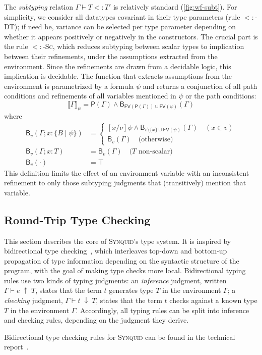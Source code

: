 \documentclass[10pt,preprint]{sigplanconf-pldi16}
\theoremstyle{definition}
\renewcommand{\And}{\wedge}
\newcommand{\Subt}{<:}
\newcommand{\env}{\Gamma}
\newcommand{\produce}{\;\uparrow\;}
\newcommand{\consume}{\;\downarrow\;}
\newcommand{\fv}{\mathsf{FV}}
\newcommand{\pathc}[1]{\mathsf{P}({#1})}
\newcommand{\bnd}[2]{\mathsf{B}_{#1}({#2})}
\newcommand{\lang}{\textsc{Synquid}\xspace}
\newif\iflong
\begin{document}
The \emph{subtyping} relation $\env \vdash T \Subt T'$ is relatively standard (\autoref{fig:wf-subt}).
For simplicity, we consider all datatypes covariant in their type parameters (rule \textsc{$\Subt$-DT});
if need be, variance can be selected per type parameter 
depending on whether it appears positively or negatively in the constructors.
The crucial part is the rule \textsc{$\Subt$-Sc}, which reduces subtyping between scalar types to implication between their refinements,
under the assumptions extracted from the environment.
Since the refinements are drawn from a decidable logic, this implication is decidable.
The function that extracts assumptions from the environment is parametrized by a formula $\psi$
and returns a conjunction of all path conditions and refinements of all variables mentioned in $\psi$ or the path conditions:
$$
\llbracket\Gamma\rrbracket_{\psi} = \pathc{\env} \And \bnd{\fv(\pathc{\env}) \cup \fv(\psi)}{\env}
$$
where
\begin{align*}
\bnd{v}{\env;x:\{B\mid\psi\}} &= 
  \begin{cases}
    [x/\nu]\psi \And \bnd{v\setminus \{x\} \cup \fv(\psi)}{\env} \quad(x\in v)\\
    \bnd{v}{\env} \quad\text{(otherwise)}
  \end{cases}\\
\bnd{v}{\env;x: T} &= \bnd{v}{\env} \quad\text{($T$ non-scalar)}\\
\bnd{v}{\cdot} &= \top
\end{align*}
This definition limits the effect of an environment variable with an inconsistent refinement
to only those subtyping judgments that (transitively) mention that variable.


\subsection{Round-Trip Type Checking}\label{sec:theory:rules}

This section describes the core of \lang's type system.
It is inspired by bidirectional type checking~\cite{PierceTu00},
which interleaves top-down and bottom-up propagation of type information 
depending on the syntactic structure of the program,
with the goal of making type checks more local.
Bidirectional typing rules use two kinds of typing judgments:
an \emph{inference} judgment, written $\env \vdash e \produce T$,
states that the term $t$ generates type $T$ in the environment $\env$;
a \emph{checking} judgment, $\env \vdash t \consume T$,
states that the term $t$ checks against a known type $T$ in the environment $\env$.
Accordingly, all typing rules can be split into inference and checking rules, 
depending on the judgment they derive.
\iflong
Bidirectional type checking rules for \lang are given in \autoref{app:proofs}.
\else
Bidirectional type checking rules for \lang can be found in the technical report~\cite{Techreport}.
\fi
\end{document}
